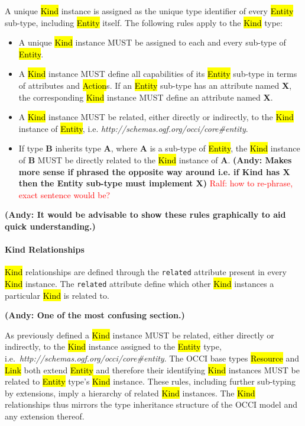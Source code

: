 \documentclass[10pt,a4paper]{article}
\newcommand{\ralf}[1]{\textcolor{red}{Ralf: #1}}
\begin{document}
A unique \hl{Kind} instance is assigned as the unique type identifier of every
\hl{Entity} sub-type, including \hl{Entity} itself. The following rules apply
to the \hl{Kind} type:
\begin{itemize}
\item A unique \hl{Kind} instance MUST be assigned to each and every sub-type
 of \hl{Entity}.
\item A \hl{Kind} instance MUST define all capabilities of its \hl{Entity}
 sub-type in terms of attributes and \hl{Action}s. If an \hl{Entity} sub-type
 has an attribute named {\bf X}, the corresponding \hl{Kind} instance MUST define
 an attribute named {\bf X}.
\item A \hl{Kind} instance MUST be related, either directly or indirectly, to
 the \hl{Kind} instance of \hl{Entity},
 i.e. \textit{http://schemas.ogf.org/occi/core\#entity}.
\item If type {\bf B} inherits type {\bf A}, where {\bf A} is a sub-type of
 \hl{Entity}, the \hl{Kind} instance of {\bf B} MUST be directly related to the
 \hl{Kind} instance of {\bf A}. \textbf{(Andy: Makes more sense if phrased 
 the opposite way around i.e. if Kind has X then the Entity sub-type must implement X)}
 \ralf{how to re-phrase, exact sentence would be?}
\end{itemize}

\textbf{(Andy: It would be advisable to show these rules graphically to aid quick understanding.)}

\paragraph*{Kind Relationships}
\label{sec:kind_relationship}
\hl{Kind} relationships are defined through the {\tt related} attribute present
in every \hl{Kind} instance. The {\tt related} attribute define which other
\hl{Kind} instances a particular \hl{Kind} is related to.

\textbf{(Andy: One of the most confusing section.)}

As previously defined a \hl{Kind} instance MUST be related, either directly or
indirectly, to the \hl{Kind} instance assigned to the \hl{Entity} type,
i.e.~\textit{http://schemas.ogf.org/occi/core\#entity}.
%
The OCCI base types \hl{Resource} and \hl{Link} both extend \hl{Entity} and
therefore their identifying \hl{Kind} instances MUST be related to \hl{Entity}
type's \hl{Kind} instance.
%
These rules, including further sub-typing by extensions, imply a hierarchy of
related \hl{Kind} instances. The \hl{Kind} relationships thus mirrors the type
inheritance structure of the OCCI model and any extension thereof.
\end{document}
